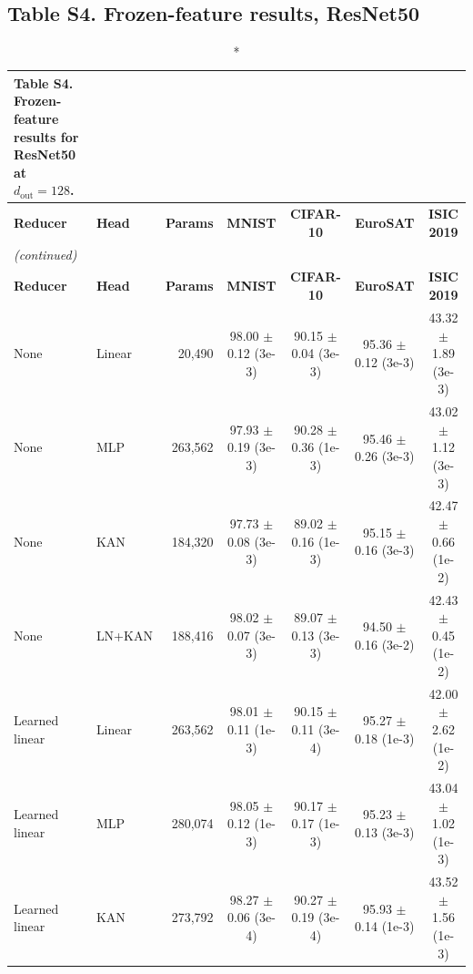 \documentclass[10pt]{article}
\begin{document}
\normalsize

\subsection*{Table S4. Frozen-feature results, ResNet50}
\scriptsize
\setlength{\tabcolsep}{3pt}
\begin{longtable}{llrcccc}
\caption*{\textbf{Table S4.} Frozen-feature results for ResNet50 at $d_{\mathrm{out}}=128$.}\\
\toprule
\textbf{Reducer} & \textbf{Head} & \textbf{Params} & \textbf{MNIST} & \textbf{CIFAR-10} & \textbf{EuroSAT} & \textbf{ISIC 2019} \\
\midrule
\endfirsthead
\multicolumn{7}{l}{\textit{(continued)}}\\
\toprule
\textbf{Reducer} & \textbf{Head} & \textbf{Params} & \textbf{MNIST} & \textbf{CIFAR-10} & \textbf{EuroSAT} & \textbf{ISIC 2019} \\
\midrule
\endhead
\bottomrule
\endfoot
None & Linear & 20,490 & 98.00 $\pm$ 0.12 (3e-3) & 90.15 $\pm$ 0.04 (3e-3) & 95.36 $\pm$ 0.12 (3e-3) & 43.32 $\pm$ 1.89 (3e-3) \\
None & MLP & 263,562 & 97.93 $\pm$ 0.19 (3e-3) & 90.28 $\pm$ 0.36 (1e-3) & 95.46 $\pm$ 0.26 (3e-3) & 43.02 $\pm$ 1.12 (3e-3) \\
None & KAN & 184,320 & 97.73 $\pm$ 0.08 (3e-3) & 89.02 $\pm$ 0.16 (1e-3) & 95.15 $\pm$ 0.16 (3e-3) & 42.47 $\pm$ 0.66 (1e-2) \\
None & LN+KAN & 188,416 & 98.02 $\pm$ 0.07 (3e-3) & 89.07 $\pm$ 0.13 (3e-3) & 94.50 $\pm$ 0.16 (3e-2) & 42.43 $\pm$ 0.45 (1e-2) \\
\midrule
Learned linear & Linear & 263,562 & 98.01 $\pm$ 0.11 (1e-3) & 90.15 $\pm$ 0.11 (3e-4) & 95.27 $\pm$ 0.18 (1e-3) & 42.00 $\pm$ 2.62 (1e-2) \\
Learned linear & MLP & 280,074 & 98.05 $\pm$ 0.12 (1e-3) & 90.17 $\pm$ 0.17 (1e-3) & 95.23 $\pm$ 0.13 (3e-3) & 43.04 $\pm$ 1.02 (1e-3) \\
Learned linear & KAN & 273,792 & 98.27 $\pm$ 0.06 (3e-4) & 90.27 $\pm$ 0.19 (3e-4) & 95.93 $\pm$ 0.14 (1e-3) & 43.52 $\pm$ 1.56 (1e-3) \\

\end{longtable}
\end{document}

